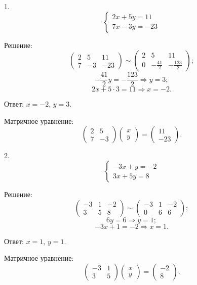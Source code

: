 \documentclass[14pt,a4paper]{extarticle}
\begin{document}
1.
\[
\left\{
\begin{array}{l}
2x + 5y = 11 \\
7x - 3y = -23
\end{array}
\right.
\]

Решение:\\
\[
\left(\begin{array}{cc|c}
2 & 5 & 11 \\
7 & -3 & -23
\end{array}\right)
\sim
\left(\begin{array}{cc|c}
2 & 5 & 11 \\
0 & -\frac{41}{2} & -\frac{123}{2}
\end{array}\right)
;\]
\[
-\frac{41}{2}y = -\frac{123}{2} \Rightarrow y = 3
;\]
\[
2x + 5 \cdot 3 = 11 \Rightarrow x = -2
.\]

Ответ: \( x = -2 \), \( y = 3 \).

Матричное уравнение:\\
\[\begin{pmatrix}2 & 5 \\7 & -3\end{pmatrix}\begin{pmatrix}x \\y\end{pmatrix}=\begin{pmatrix}11 \\-23\end{pmatrix}.\]

2.
\[
\left\{
\begin{array}{l}
-3x + y = -2 \\
3x + 5y = 8
\end{array}
\right.
\]

Решение:\\
\[
\left(\begin{array}{cc|c}
-3 & 1 & -2 \\
3 & 5 & 8
\end{array}\right)
\sim
\left(\begin{array}{cc|c}
-3 & 1 & -2 \\
0 & 6 & 6
\end{array}\right)
;\]
\[
6y = 6 \Rightarrow y = 1
;\]
\[
-3x + 1 = -2 \Rightarrow x = 1
.\]

Ответ: \( x = 1 \), \( y = 1 \).

Матричное уравнение:
\[\begin{pmatrix}-3 & 1 \\3 & 5\end{pmatrix}\begin{pmatrix}x \\y\end{pmatrix}=\begin{pmatrix}-2 \\8\end{pmatrix}.\]
\end{document}
